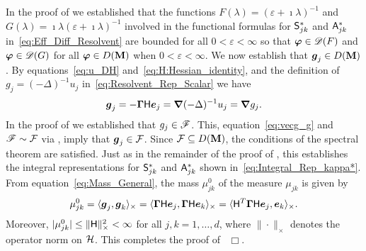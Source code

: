 \documentclass[amsa]{ipart}
\begin{document}
In the proof of  we established that the
functions $F(\lambda)=(\varepsilon+\imath\lambda)^{-1}$ and $G(\lambda)=\imath\lambda(\varepsilon+\imath\lambda)^{-1}$ involved in the
functional formulas for $\mathsf{S}^*_{jk}$ and $\mathsf{A}^*_{jk}$
in~\eqref{eq:Eff_Diff_Resolvent} are bounded for all $0<\varepsilon<\infty$ so  
that $\boldsymbol{\varphi}\in\mathscr{D}(F)$ and $\boldsymbol{\varphi}\in\mathscr{D}(G)$ for all $\boldsymbol{\varphi}\in
D(\mathbf{M})$ when $0<\varepsilon<\infty$. We now establish that $\boldsymbol{g}_j\in D(\mathbf{M})$. By
equations~\eqref{eq:u_DH} and~\eqref{eq:H:Hessian_identity}, and the
definition of $g_j=(-\Delta)^{-1}u_j$ in~\eqref{eq:Resolvent_Rep_Scalar} we
have   
%
\begin{align}\label{eq:vecg_g}
  \vecg_j=-\bGamma\Hm\vece_j=\bnabla(-\Delta)^{-1}u_j=\bnabla g_j.
\end{align}
%
In the proof of  we established that
$g_j\in\mathscr{F}$. This, equation~\eqref{eq:vecg_g} and $\mathscr{F}\sim\mathcal{F}$ via
, imply that $\boldsymbol{g}_j\in\mathcal{F}$.   
Since $\mathcal{F}\subseteq D(\mathbf{M})$, the conditions of the spectral theorem are 
satisfied. Just as in the remainder of the proof of
, this establishes the integral
representations for $\mathsf{S}^*_{jk}$ and $\mathsf{A}^*_{jk}$ shown
in~\eqref{eq:Integral_Rep_kappa*}. From 
equation~\eqref{eq:Mass_General}, the mass $\mu_{jk}^0$ of the measure 
$\mu_{jk}$ is given by  
% 
\begin{align}\label{eq:Mass}
  \mu^0_{jk}   =\langle\vecg_j,\vecg_k\rangle_\times
        =\langle\bGamma\Hm\vece_j,\bGamma\Hm\vece_k\rangle_\times 
        =\langle\Hm^T\bGamma\Hm\vece_j,\vece_k\rangle_\times.     
\end{align}
%
Moreover,  $|\mu^0_{jk}|\leq\|\mathsf{H}\|_\times^2<\infty$ for all $j,k=1,\ldots,d$, where $\|\cdot\|_\times$
denotes the operator norm on $\mathcal{H}$. This completes the proof
of~ $\Box$.  
\end{document}
